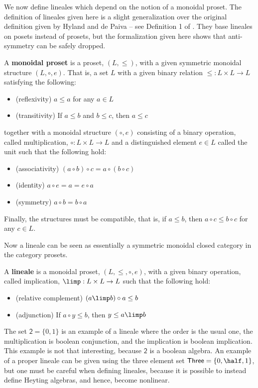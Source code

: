 We now define lineales which depend on the notion of a monoidal
proset.  The definition of lineales given here is a slight
generalization over the original definition given by Hyland and de
Paiva -- see Definition 1 of \cite{Hyland:1991}.  They base lineales
on posets instead of prosets, but the formalization given here shows
that anti-symmetry can be safely dropped.
\begin{definition}
  \label{def:monoidal-proset}
  A \textbf{monoidal proset} is a proset, $(L, \leq)$, with a given
  symmetric monoidal structure $(L, \circ, e)$.  That is, a set $L$
  with a given binary relation $\leq : L \times L \to L$ satisfying
  the following:
  \begin{itemize}
  \item (reflexivity) $a \leq a$ for any $a \in L$
  \item (transitivity) If $a \leq b$ and $b \leq c$, then $a \leq c$
  \end{itemize}
  together with a monoidal structure $(\circ, e)$ consisting of a
  binary operation, called multiplication, $\circ : L \times L \to L$
  and a distinguished element $e \in L$ called the unit such that the
  following hold:
  \begin{itemize}
  \item (associativity) $(a \circ b) \circ c = a \circ (b \circ c)$
  \item (identity) $a \circ e = a = e \circ a$
  \item (symmetry) $a \circ b = b \circ a$
  \end{itemize}
  Finally, the structures must be compatible, that is, if $a \leq b$,
  then $a \circ c \leq b \circ c$ for any $c \in L$.
\end{definition}
Now a lineale can be seen as essentially a symmetric monoidal closed
category in the category prosets.
\begin{definition}
  \label{def:lineale}
  A \textbf{lineale} is a monoidal proset, $(L, \leq, \circ, e)$, with
  a given binary operation, called implication, $\limp : L \times L
  \to L$ such that the following hold:
  \begin{itemize}
  \item (relative complement) $(a \limp b) \circ a \leq b$ 
  \item (adjunction) If $a \circ y \leq b$, then $y \leq a \limp b$
  \end{itemize}
\end{definition}
The set $\mathsf{2} = \{0,1\}$ is an example of a lineale where the
order is the usual one, the multiplication is boolean conjunction, and
the implication is boolean implication.  This example is not that
interesting, because $\mathsf{2}$ is a boolean algebra.  An example of
a proper lineale can be given using the three element set
$\mathsf{Three} = \{0,\half, 1\}$, but one must be careful when
defining lineales, because it is possible to instead define Heyting
algebras, and hence, become nonlinear.

